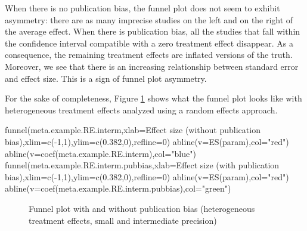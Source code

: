 \documentclass[
]{book}
\newenvironment{Shaded}{\begin{snugshade}}{\end{snugshade}}
\newcommand{\AttributeTok}[1]{\textcolor[rgb]{0.77,0.63,0.00}{#1}}
\newcommand{\DecValTok}[1]{\textcolor[rgb]{0.00,0.00,0.81}{#1}}
\newcommand{\FloatTok}[1]{\textcolor[rgb]{0.00,0.00,0.81}{#1}}
\newcommand{\FunctionTok}[1]{\textcolor[rgb]{0.00,0.00,0.00}{#1}}
\newcommand{\NormalTok}[1]{#1}
\newcommand{\SpecialCharTok}[1]{\textcolor[rgb]{0.00,0.00,0.00}{#1}}
\newcommand{\StringTok}[1]{\textcolor[rgb]{0.31,0.60,0.02}{#1}}
\theoremstyle{definition}
\theoremstyle{definition}
\theoremstyle{definition}
\theoremstyle{definition}
\theoremstyle{remark}
\begin{document}
When there is no publication bias, the funnel plot does not seem to exhibit asymmetry: there are as many imprecise studies on the left and on the right of the average effect.
When there is publication bias, all the studies that fall within the confidence interval compatible with a zero treatment effect disappear.
As a consequence, the remaining treatment effects are inflated versions of the truth.
Moreover, we see that there is an increasing relationship between standard error and effect size.
This is a sign of funnel plot asymmetry.

For the sake of completeness, Figure \ref{fig:FunnelPlotRE} shows what the funnel plot looks like with heterogeneous treatment effects analyzed using a random effects approach.

\begin{Shaded}
\begin{Highlighting}[]
\FunctionTok{funnel}\NormalTok{(meta.example.RE.interm,}\AttributeTok{xlab=}\StringTok{\textquotesingle{}Effect size (without publication bias)\textquotesingle{}}\NormalTok{,}\AttributeTok{xlim=}\FunctionTok{c}\NormalTok{(}\SpecialCharTok{{-}}\DecValTok{1}\NormalTok{,}\DecValTok{1}\NormalTok{),}\AttributeTok{ylim=}\FunctionTok{c}\NormalTok{(}\FloatTok{0.382}\NormalTok{,}\DecValTok{0}\NormalTok{),}\AttributeTok{refline=}\DecValTok{0}\NormalTok{)}
\FunctionTok{abline}\NormalTok{(}\AttributeTok{v=}\FunctionTok{ES}\NormalTok{(param),}\AttributeTok{col=}\StringTok{"red"}\NormalTok{)}
\FunctionTok{abline}\NormalTok{(}\AttributeTok{v=}\FunctionTok{coef}\NormalTok{(meta.example.RE.interm),}\AttributeTok{col=}\StringTok{"blue"}\NormalTok{)}
\FunctionTok{funnel}\NormalTok{(meta.example.RE.interm.pubbias,}\AttributeTok{xlab=}\StringTok{\textquotesingle{}Effect size (with publication bias)\textquotesingle{}}\NormalTok{,}\AttributeTok{xlim=}\FunctionTok{c}\NormalTok{(}\SpecialCharTok{{-}}\DecValTok{1}\NormalTok{,}\DecValTok{1}\NormalTok{),}\AttributeTok{ylim=}\FunctionTok{c}\NormalTok{(}\FloatTok{0.382}\NormalTok{,}\DecValTok{0}\NormalTok{),}\AttributeTok{refline=}\DecValTok{0}\NormalTok{)}
\FunctionTok{abline}\NormalTok{(}\AttributeTok{v=}\FunctionTok{ES}\NormalTok{(param),}\AttributeTok{col=}\StringTok{"red"}\NormalTok{)}
\FunctionTok{abline}\NormalTok{(}\AttributeTok{v=}\FunctionTok{coef}\NormalTok{(meta.example.RE.interm.pubbias),}\AttributeTok{col=}\StringTok{"green"}\NormalTok{)}
\end{Highlighting}
\end{Shaded}

\begin{figure}[htbp]

{\centering {}

}

\caption{Funnel plot with and without publication bias (heterogeneous treatment effects, small and intermediate precision)}\label{fig:FunnelPlotRE}
\end{figure}
\end{document}
